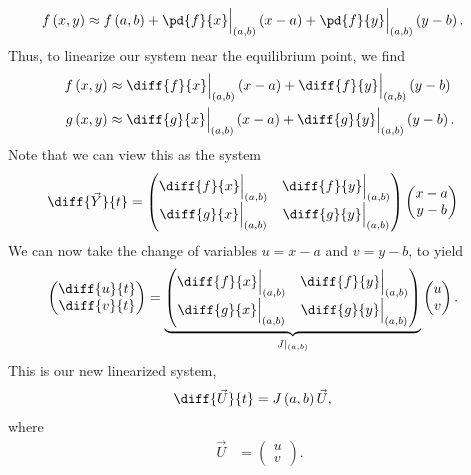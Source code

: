 \documentclass[10pt]{mypackage}
\begin{document}
\begin{align*}
  f\left(x,y\right) &\approx f\left(a,b\right) + \pd{f}{x}\Bigr\vert_{\left(a,b\right)}\left(x-a\right) + \pd{f}{y}\Bigr\vert_{\left(a,b\right)}\left(y-b\right).
\end{align*}
Thus, to linearize our system near the equilibrium point, we find
\begin{align*}
  f\left(x,y\right) &\approx \diff{f}{x}\Bigr\vert_{\left(a,b\right)}\left(x-a\right) + \diff{f}{y} \Bigr\vert_{\left(a,b\right)}\left(y-b\right)\\
  g\left(x,y\right) &\approx \diff{g}{x}\Bigr\vert_{\left(a,b\right)}\left(x-a\right) + \diff{g}{y}\Bigr\vert_{\left(a,b\right)}\left(y-b\right).
\end{align*}
Note that we can view this as the system
{ \renewcommand{\arraystretch}{1.75}
  \begin{align*}
    \diff{\vec{Y}}{t} &= \begin{pmatrix}\diff{f}{x}\Bigr\vert_{\left(a,b\right)} & \diff{f}{y} \Bigr\vert_{\left(a,b\right)} \\ \diff{g}{x}\Bigr\vert_{\left(a,b\right)} & \diff{g}{y}\Bigr\vert_{\left(a,b\right)}\end{pmatrix} \begin{pmatrix}x-a\\y-b\end{pmatrix}
  \end{align*}
}
We can now take the change of variables $u = x-a$ and $v = y-b$, to yield
{\renewcommand{\arraystretch}{1.75}
  \begin{align*}
    \begin{pmatrix}\diff{u}{t} \\ \diff{v}{t}\end{pmatrix} &= \underbrace{\begin{pmatrix}\diff{f}{x}\Bigr\vert_{\left(a,b\right)} & \diff{f}{y} \Bigr\vert_{\left(a,b\right)} \\ \diff{g}{x}\Bigr\vert_{\left(a,b\right)} & \diff{g}{y}\Bigr\vert_{\left(a,b\right)}\end{pmatrix}}_{J|_{(a,b)}} \begin{pmatrix}u\\v\end{pmatrix}.
  \end{align*}
}
This is our new linearized system, 
\begin{align*}
  \diff{\vec{U}}{t} &= J\left(a,b\right) \vec{U},
\end{align*}
where
\begin{align*}
  \vec{U} &= \begin{pmatrix}u\\v\end{pmatrix}.
\end{align*}
\end{document}
